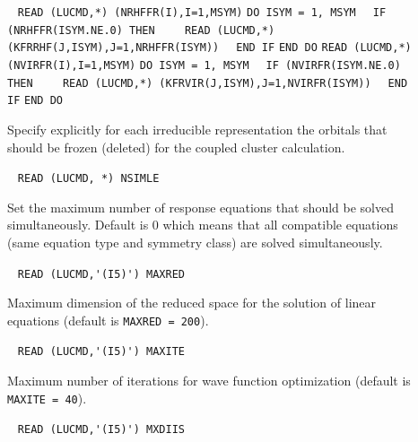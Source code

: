 \begin{description}
\item[]  \verb| |\newline
    \verb|READ (LUCMD,*) (NRHFFR(I),I=1,MSYM)|\newline
    \verb|DO ISYM = 1, MSYM|\newline
    \verb|  IF (NRHFFR(ISYM.NE.0) THEN|\newline
    \verb|    READ (LUCMD,*) (KFRRHF(J,ISYM),J=1,NRHFFR(ISYM))|\newline
    \verb|  END IF|\newline
    \verb|END DO|\newline
    \verb|READ (LUCMD,*) (NVIRFR(I),I=1,MSYM)|\newline
    \verb|DO ISYM = 1, MSYM|\newline
    \verb|  IF (NVIRFR(ISYM.NE.0) THEN|\newline
    \verb|    READ (LUCMD,*) (KFRVIR(J,ISYM),J=1,NVIRFR(ISYM))|\newline
    \verb|  END IF|\newline
    \verb|END DO|

    Specify explicitly for each irreducible representation the
    orbitals that should be frozen (deleted) for the coupled cluster
    calculation.
 
\item[] \verb| |\newline
  \verb|READ (LUCMD, *) NSIMLE|

  Set the maximum number of response equations that should be 
  solved simultaneously. Default is 0 which means that all
  compatible equations (same equation type and symmetry class) 
  are solved simultaneously.
 
\item[] \verb| |\newline 
  \verb|READ (LUCMD,'(I5)') MAXRED|

  Maximum dimension of the reduced space for the 
  solution of linear equations (default is \verb+MAXRED = 200+).
 
\item[] \verb| |\newline
  \verb|READ (LUCMD,'(I5)') MAXITE|

  Maximum number of iterations for wave function optimization 
  (default is \verb+MAXITE = 40+).
 
\item[] \verb| |\newline
  \verb|READ (LUCMD,'(I5)') MXDIIS|


\end{description}
